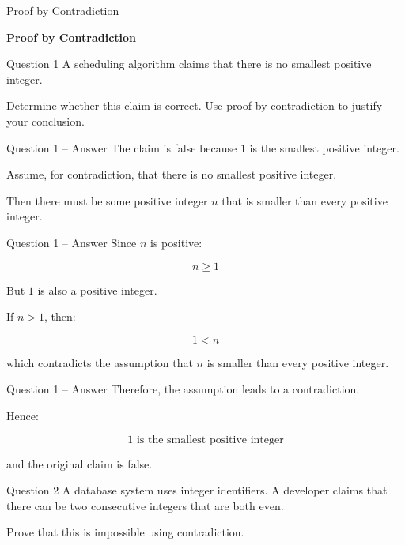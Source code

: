 \begin{frame}{Proof by Contradiction}
\begin{center}
\vspace{1.5cm}
{\Huge\textbf{Proof by Contradiction}}
\end{center}
\end{frame}


\begin{frame}{Question 1}
A scheduling algorithm claims that there is no smallest positive integer.

Determine whether this claim is correct. Use proof by contradiction to
justify your conclusion.
\end{frame}

\begin{frame}{Question 1 -- Answer}
The claim is false because $1$ is the smallest positive integer.

Assume, for contradiction, that there is no smallest positive integer.

Then there must be some positive integer $n$ that is smaller than every
positive integer.
\end{frame}

\begin{frame}{Question 1 -- Answer}
Since $n$ is positive:

$$
n\geq1
$$

But $1$ is also a positive integer.

If $n>1$, then:

$$
1<n
$$

which contradicts the assumption that $n$ is smaller than every positive
integer.
\end{frame}

\begin{frame}{Question 1 -- Answer}
Therefore, the assumption leads to a contradiction.

Hence:

$$
\boxed{1\text{ is the smallest positive integer}}
$$

and the original claim is false.
\end{frame}


\begin{frame}{Question 2}
A database system uses integer identifiers. A developer claims that there
can be two consecutive integers that are both even.

Prove that this is impossible using contradiction.
\end{frame}

